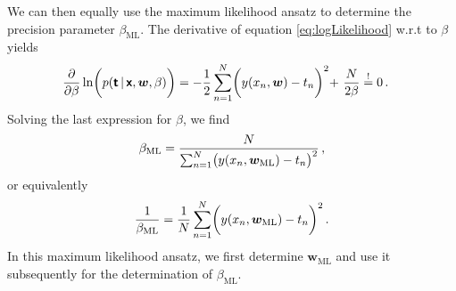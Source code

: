 \documentclass[11pt, DINA4, fleqn]{amsart}
\begin{document}
We can then equally use the maximum likelihood ansatz to determine the precision parameter $\beta_{\text{ML}}$. The derivative of equation \eqref{eq:logLikelihood} w.r.t to $\beta$ yields
\begin{align}
\dfrac{\partial}{\partial \beta} \ln\biggl(p(\boldsymbol{\mathsf{t}} \, | \, \boldsymbol{\mathsf{x}}, \bm{w}, \beta)\biggl) &= -\dfrac{1}{2}\sum\displaylimits_{n=1}^{N} \biggl(y(x_n, \bm{w}) - t_n\biggl)^2
+\,\, \dfrac{N}{2\beta} \stackrel{!}{=} 0 \, .
\end{align}
Solving the last expression for $\beta$, we find
\begin{align}
\beta_{\text{ML}} = \dfrac{N}{\sum\displaylimits_{n=1}^{N} \bigl(y(x_n, \bm{w}_{\text{ML}}) - t_n\bigl)^2} \, ,
\end{align}
or equivalently
\begin{align}
\dfrac{1}{\beta_{\text{ML}}} = \dfrac{1}{N} \sum\displaylimits_{n=1}^{N} \biggl(y(x_n, \bm{w}_{\text{ML}}) - t_n\biggl)^2 \, .
\end{align}
In this maximum likelihood ansatz, we first determine $\bm{w}_{\text{ML}}$ and use it subsequently for the determination of $\beta_{\text{ML}}$.
\end{document}
